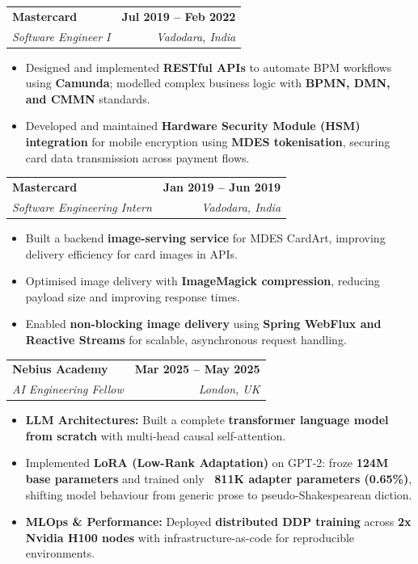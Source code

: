 \documentclass[letterpaper,11pt]{article}
\makeatletter
\newcommand{\resumeItem}[1]{
  \item\small{
    {#1 \vspace{-3pt}}
  }
}
\newcommand{\resumeSubheading}[4]{
  \vspace{-3pt}\item
    \begin{tabular*}{1.0\textwidth}[t]{l@{\extracolsep{\fill}}r}
      \textbf{#1} & \textbf{\small #2} \\
      \textit{\small#3} & \textit{\small #4} \\
    \end{tabular*}\vspace{-7pt}
}
\newcommand{\resumeItemListStart}{\begin{itemize}}
\newcommand{\resumeItemListEnd}{\end{itemize}\vspace{0pt}}
\makeatother
\begin{document}
    \resumeSubheading
      {Mastercard}{Jul 2019 -- Feb 2022}
      {Software Engineer I}{Vadodara, India}
      \resumeItemListStart
        \resumeItem{Designed and implemented \textbf{RESTful APIs} to automate BPM workflows using \textbf{Camunda}; modelled complex business logic with \textbf{BPMN, DMN, and CMMN} standards.}
        \resumeItem{Developed and maintained \textbf{Hardware Security Module (HSM) integration} for mobile encryption using \textbf{MDES tokenisation}, securing card data transmission across payment flows.}
      \resumeItemListEnd

    \resumeSubheading
      {Mastercard}{Jan 2019 -- Jun 2019}
      {Software Engineering Intern}{Vadodara, India}
      \resumeItemListStart
        \resumeItem{Built a backend \textbf{image-serving service} for MDES CardArt, improving delivery efficiency for card images in APIs.}
        \resumeItem{Optimised image delivery with \textbf{ImageMagick compression}, reducing payload size and improving response times.}
        \resumeItem{Enabled \textbf{non-blocking image delivery} using \textbf{Spring WebFlux and Reactive Streams} for scalable, asynchronous request handling.}
      \resumeItemListEnd

    \resumeSubheading
      {Nebius Academy}{Mar 2025 -- May 2025}
      {AI Engineering Fellow}{London, UK}
      \resumeItemListStart
        \resumeItem{\textbf{LLM Architectures:} Built a complete \textbf{transformer language model from scratch} with multi-head causal self-attention.}
        \resumeItem{Implemented \textbf{LoRA (Low-Rank Adaptation)} on GPT-2: froze \textbf{124M base parameters} and trained only \textbf{~811K adapter parameters (0.65\%)}, shifting model behaviour from generic prose to pseudo-Shakespearean diction.}
        \resumeItem{\textbf{MLOps \& Performance:} Deployed \textbf{distributed DDP training} across \textbf{2x Nvidia H100 nodes} with infrastructure-as-code for reproducible environments.}
      \resumeItemListEnd
\end{document}
